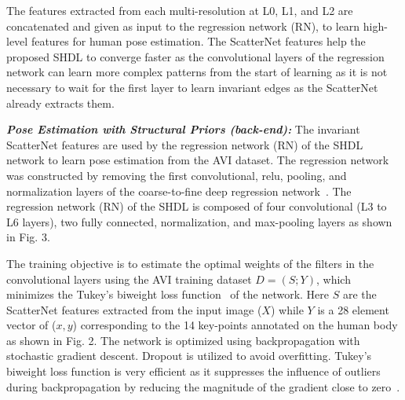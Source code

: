 \documentclass[10pt,twocolumn,letterpaper]{article}
\begin{document}
The features extracted from each multi-resolution at L0, L1, and L2 are concatenated and given as input to the regression network (RN), to learn high-level features for human pose estimation. The ScatterNet features help the proposed SHDL to converge faster as the convolutional layers of the regression network can learn more complex patterns from the start of learning as it is not necessary to wait for the first layer to learn invariant edges as the ScatterNet already extracts them.

\textbf{\textit{Pose Estimation with Structural Priors (back-end):}}
The invariant ScatterNet features are used by the regression network (RN) of the SHDL network to learn pose estimation from the AVI dataset. The regression network was constructed by removing the first convolutional, relu, pooling, and normalization layers of the coarse-to-fine deep regression network~\cite{belagiannis2015robust}. The regression network (RN) of the SHDL is composed of four convolutional (L3 to L6 layers), two fully connected, normalization, and max-pooling layers as shown in Fig. 3. 

The training objective is to estimate the optimal weights of the filters in the convolutional layers using the AVI training dataset $D = (S; Y)$, which minimizes the Tukey's biweight loss function~\cite{belagiannis2015robust} of the network. Here $S$ are the ScatterNet features extracted from the input image ($X$) while $Y$ is a 28  element vector of ($x,y$) corresponding to the 14 key-points annotated on the human body as shown in Fig. 2. The network is optimized using backpropagation with stochastic gradient descent. Dropout is utilized to avoid overfitting. Tukey's biweight loss function is very efficient as it suppresses the influence of outliers during backpropagation by reducing the magnitude of the gradient close to zero~\cite{belagiannis2015robust}. 
\end{document}
